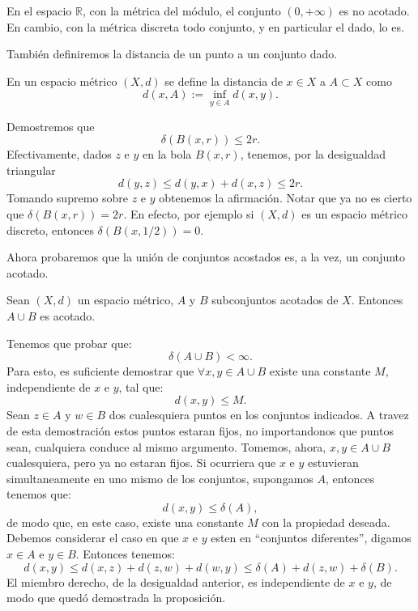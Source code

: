 \begin{ejemplo} En el espacio $\mathbb{R}$, con la m\'etrica del
m\'odulo, el conjunto $(0,+\infty)$ es no acotado. En cambio, con
la m\'etrica discreta todo conjunto, y en particular el dado, lo
es.
\end{ejemplo}

Tambi\'en definiremos la distancia de un punto a un conjunto dado.

\begin{definicion} En un espacio m\'etrico $(X,d)$ se define la
distancia de $x\in X$ a $A\subset X$ como
\[d(x,A):=\inf\limits_{y\in A}d(x,y).\]
\end{definicion}

Demostremos que
\[\delta(B(x,r))\leq 2r.\]
Efectivamente, dados $z$ e $y$ en la bola $B(x,r)$, tenemos, por
la desigualdad triangular
\[d(y,z)\leq d(y,x)+d(x,z)\leq 2r.\]
Tomando supremo sobre $z$ e $y$ obtenemos la afirmaci\'on. Notar
que ya no es cierto que $\delta(B(x,r))=2r$. En efecto, por
ejemplo si $(X,d)$ es un espacio m\'etrico discreto, entonces
$\delta(B(x,1/2))=0$.

Ahora probaremos que la uni\'on de conjuntos acostados es, a la
vez, un conjunto acotado.

\begin{proposicion} Sean $(X,d)$ un espacio m\'etrico, $A$ y $B$
subconjuntos acotados de $X$. Entonces $A\cup B$ es acotado.
\end{proposicion}
\begin{demo}  Tenemos que probar que:
	\[\delta(A\cup B)<\infty.\]
Para esto, es suficiente demostrar que $\forall x,y\in A\cup B$
existe una constante $M$, independiente de $x$ e $y$, tal que:
\[d(x,y)\leq M.\]
Sean $z\in A$ y $w\in B$ dos cualesquiera puntos en los conjuntos
indicados. A travez de esta demostraci\'on estos puntos estaran
fijos, no importandonos que puntos sean, cualquiera conduce al
mismo argumento. Tomemos, ahora, $x,y\in A\cup B$ cualesquiera,
pero ya no estaran fijos. Si ocurriera que $x$ e $y$ estuvieran
simultaneamente en uno mismo de los conjuntos, supongamos $A$,
entonces tenemos que:
\[d(x,y)\leq \delta(A),\]
de modo que, en este caso, existe una constante $M$ con la
propiedad deseada. Debemos considerar el caso en que $x$ e $y$
esten en ``conjuntos diferentes'', digamos $x\in A$ e $y\in B$.
Entonces tenemos:
\[
	d(x,y)\leq d(x,z)+d(z,w)+d(w,y)\leq \delta(A)+d(z,w)+\delta(B).
\]
El miembro derecho, de la desigualdad anterior, es independiente
de $x$ e $y$, de modo que qued\'o demostrada la  proposici\'on.
\end{demo}

